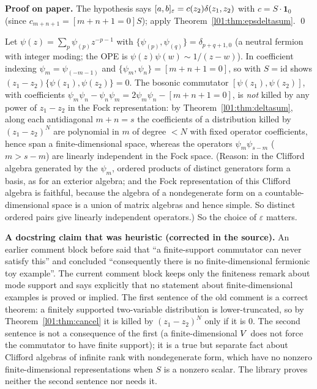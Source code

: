 \textbf{Proof on paper.} The hypothesis says $[a,b]_\varepsilon = c(z_2)\delta(z_1,z_2)$ with $c = S\cdot\mathbf 1_0$ (since
$c_{m+n+1} = [m+n+1 = 0]S$); apply Theorem~\ref{l01:thm:epsdeltasum}. \qed

\begin{example}\label{l01:ex:fermion}
Let $\psi(z) = \sum_p\psi_{(p)}z^{-p-1}$ with $\{\psi_{(p)},\psi_{(q)}\} = \delta_{p+q+1,0}$ (a neutral fermion with
integer moding; the OPE is $\psi(z)\psi(w)\sim1/(z-w)$). In coefficient indexing $\psi_m = \psi_{(-m-1)}$ and
$\{\psi_m,\psi_n\} = [m+n+1 = 0]$, so  with $S = \mathrm{id}$ shows
$(z_1-z_2)\{\psi(z_1),\psi(z_2)\} = 0$. The bosonic commutator $[\psi(z_1),\psi(z_2)]$, with coefficients
$\psi_m\psi_n-\psi_n\psi_m = 2\psi_m\psi_n-[m+n+1=0]$, is \emph{not} killed by any power of $z_1-z_2$ in the Fock
representation: by Theorem~\ref{l01:thm:deltasum}, along each antidiagonal $m+n = s$ the coefficients of a distribution
killed by $(z_1-z_2)^N$ are polynomial in $m$ of degree $<N$ with fixed operator coefficients, hence span a
finite-dimensional space, whereas the operators $\psi_m\psi_{s-m}$ ($m>s-m$) are linearly independent in the Fock
space. (Reason: in the Clifford algebra generated by the $\psi_m$, ordered products of distinct generators form a
basis, as for an exterior algebra; and the Fock representation of this Clifford algebra is faithful, because the
algebra of a nondegenerate form on a countable-dimensional space is a union of matrix algebras and hence simple.
So distinct ordered pairs give linearly independent operators.) So the choice of $\varepsilon$ matters.
\end{example}

\begin{warning}\label{l01:warn:finitefermion}
\textbf{A docstring claim that was heuristic (corrected in the source).} An earlier comment block before
 said that ``a finite-support commutator can never satisfy this'' and concluded ``consequently
there is no finite-dimensional fermionic toy example''. The current comment block keeps only the finiteness remark
about mode support and says explicitly that no statement about finite-dimensional examples is proved or implied. The
first sentence of the old comment is a correct theorem: a finitely supported two-variable
distribution is lower-truncated, so by Theorem~\ref{l01:thm:cancel} it is killed by $(z_1-z_2)^N$ only if it is $0$.
The second sentence is not a consequence of the first (a finite-dimensional $V$ does not force the
commutator to have finite support); it is a true but separate fact about Clifford algebras of infinite rank
with nondegenerate form, which have no nonzero finite-dimensional representations when $S$ is a nonzero scalar.
The library proves neither the second sentence nor needs it.
\end{warning}

